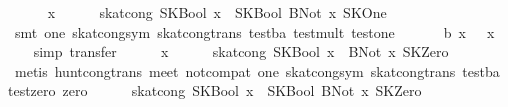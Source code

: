 \begin{isabellebody}
\ \ \ \ \isamarkupfalse%
\ x\isanewline
\ \ \ \ \isamarkupfalse%
\ {}skat{}cong\ {}SKBool\ x\ {}\ SKBool\ {}BNot\ x{}{}\ SKOne{}\isanewline
\ \ \ \ \ \ \isamarkupfalse%
\ {}smt\ one\ skat{}cong{}sym\ skat{}cong{}trans\ test{}ba\ test{}mult\ test{}one{}\isanewline
\ \ \isamarkupfalse%
\isanewline
\ \ \isamarkupfalse%
\ b{}\ {}x\ {}\ {}\ x\ {}\ {}{}\isanewline
\ \ \isamarkupfalse%
\ {}simp{}\ transfer{}\isanewline
\ \ \ \ \isamarkupfalse%
\ x\isanewline
\ \ \ \ \isamarkupfalse%
\ {}skat{}cong\ {}SKBool\ {}x\ {}{}{}\ BNot\ x{}{}\ SKZero{}\isanewline
\ \ \ \ \ \ \isamarkupfalse%
\ {}metis\ hunt{}cong{}trans\ meet\ not{}compat\ one\ skat{}cong{}sym\ skat{}cong{}trans\ test{}ba\ test{}zero\ zero{}\isanewline
\ \ \ \ \isamarkupfalse%
\ {}skat{}cong\ {}SKBool\ x\ {}\ SKBool\ {}BNot\ x{}{}\ SKZero{}\isanewline

\end{isabellebody}

